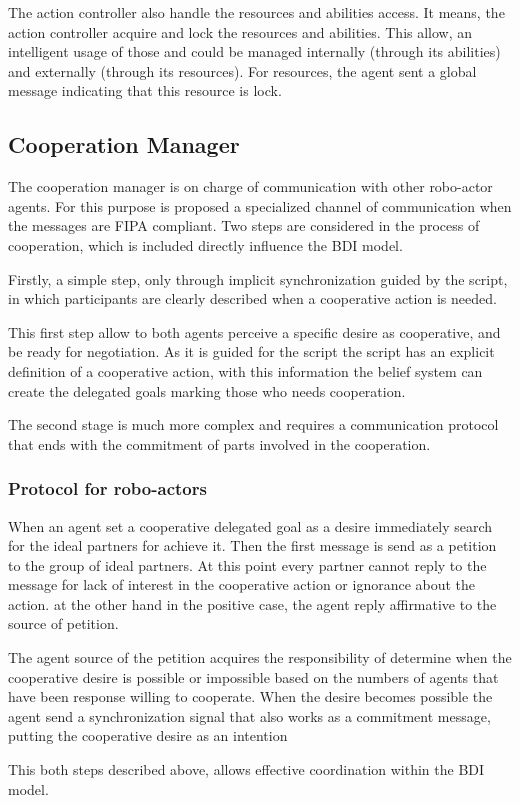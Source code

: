 The action controller also handle the resources and abilities access. It means, the action controller acquire and lock the resources and abilities. This allow, an intelligent usage of those and could be managed internally (through its abilities) and externally (through its resources). For resources, the agent sent a global message indicating that this resource is lock.

\subsection{Cooperation Manager}

The cooperation manager is on charge of communication with other robo-actor agents. For this purpose is proposed a specialized channel of communication when the messages are FIPA compliant. Two steps are considered in the process of cooperation, which is included directly influence the BDI model. 

Firstly, a simple step, only through implicit synchronization guided by the script, in which participants are clearly described when a cooperative action is needed.

This first step allow to both agents perceive a specific desire as cooperative, and be ready for negotiation. As it is guided for the script the script has an explicit definition of a cooperative action, with this information the belief system can create the delegated goals marking those who needs cooperation.

The second stage is much more complex and requires a communication protocol that ends with the commitment of parts involved in the cooperation. 

\subsubsection{Protocol for robo-actors}

When an agent set a cooperative delegated goal as a desire immediately search for the ideal partners for achieve it. Then the first message is send  as a petition to the group of ideal partners. At this point every partner cannot reply to the message for lack of interest in the cooperative action or ignorance about the action. at the other hand in the positive case, the agent reply affirmative to the source of petition.

The agent source of the petition acquires the responsibility of determine when the cooperative desire is possible or impossible based on the numbers of agents that have been response willing to cooperate. When the desire becomes possible the agent send a synchronization signal that also works as a commitment message, putting the cooperative desire as an intention

This both steps described above, allows effective coordination within the BDI model. 